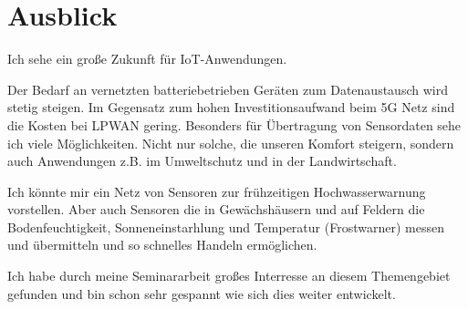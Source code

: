 \documentclass[a4paper, 12pt]{article}
\begin{document}
    \section{Ausblick}
        Ich sehe ein große Zukunft für IoT-Anwendungen.
        
        Der Bedarf an vernetzten batteriebetrieben Geräten zum Datenaustausch wird stetig steigen. Im Gegensatz zum hohen
        Investitionsaufwand beim 5G Netz sind die Kosten bei LPWAN gering. Besonders für Übertragung von Sensordaten 
        sehe ich viele Möglichkeiten. Nicht nur solche, die unseren Komfort steigern, sondern auch 
        Anwendungen z.B. im Umweltschutz und in der Landwirtschaft.

        Ich könnte mir ein Netz von Sensoren zur frühzeitigen Hochwasserwarnung vorstellen. Aber auch Sensoren 
        die in Gewächshäusern und auf Feldern die Bodenfeuchtigkeit, Sonneneinstarhlung und Temperatur (Frostwarner) messen
        und übermitteln und so schnelles Handeln ermöglichen.

        Ich habe durch meine Seminararbeit großes Interresse an diesem Themengebiet gefunden und bin schon 
        sehr gespannt wie sich dies weiter entwickelt.


      
    \newpage
    
    
\end{document}
